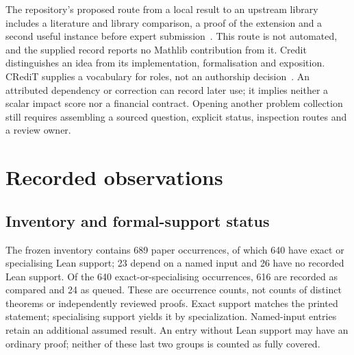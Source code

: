 \documentclass[10pt]{article}
\newcommand{\LedgerRows}{689}
\newcommand{\LedgerNamedInput}{23}
\newcommand{\LedgerNoLean}{26}
\newcommand{\LedgerFormal}{640}
\newcommand{\LedgerCompared}{616}
\newcommand{\LedgerQueued}{24}
\begin{document}
The repository's proposed route from a local result to an upstream library includes a literature and library comparison, a proof of the extension and a second useful instance before expert submission~\cite{mathlibcontrib}.
This route is not automated, and the supplied record reports no Mathlib contribution from it.
Credit distinguishes an idea from its implementation, formalisation and exposition. CRediT supplies a vocabulary for roles, not an authorship decision~\cite{credit}.
An attributed dependency or correction can record later use; it implies neither a scalar impact score nor a financial contract.
Opening another problem collection still requires assembling a sourced question, explicit status, inspection routes and a review owner.

\section{Recorded observations}\label{sec:instance}\label{sec:evaluation}
\subsection{Inventory and formal-support status}
The frozen inventory contains \LedgerRows{} paper occurrences, of which \LedgerFormal{} have exact or specialising Lean support; \LedgerNamedInput{} depend on a named input and \LedgerNoLean{} have no recorded Lean support.
Of the \LedgerFormal{} exact-or-specialising occurrences, \LedgerCompared{} are recorded as compared and \LedgerQueued{} as queued.
These are occurrence counts, not counts of distinct theorems or independently reviewed proofs. Exact support matches the printed statement; specialising support yields it by specialization. Named-input entries retain an additional assumed result. An entry without Lean support may have an ordinary proof; neither of these last two groups is counted as fully covered.
\end{document}
